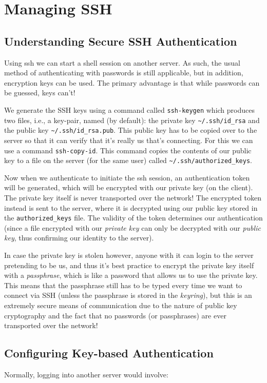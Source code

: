 \chapter{Managing SSH}

\section{Understanding Secure SSH Authentication}
Using ssh we can start a shell session on another server. As such, the usual method of authenticating with passwords is still applicable, but in addition, encryption keys can be used. The primary advantage is that while passwords can be guessed, keys can't!

We generate the SSH keys using a command called \verb|ssh-keygen| which produces two files, i.e., a key-pair, named (by default): the private key \verb|~/.ssh/id_rsa| and the public key \verb|~/.ssh/id_rsa.pub|. This public key has to be copied over to the server so that it can verify that it's really us that's connecting. For this we can use a command \verb|ssh-copy-id|. This command copies the contents of our public key to a file on the server (for the same user) called \verb|~/.ssh/authorized_keys|. 

Now when we authenticate to initiate the ssh session, an authentication token will be generated, which will be encrypted with our private key (on the client). The private key itself is never transported over the network! The encrypted token instead is sent to the server, where it is decrypted using our public key stored in the \verb|authorized_keys| file. The validity of the token determines our authentication (since a file encrypted with our \textit{private key} can only be decrypted with our \textit{public key}, thus confirming our identity to the server).

In case the private key is stolen however, anyone with it can login to the server pretending to be us, and thus it's best practice to encrypt the private key itself with a \textit{passphrase}, which is like a password that allows us to use the private key. This means that the passphrase still has to be typed every time we want to connect via SSH (unless the passphrase is stored in the \textit{keyring}), but this is an extremely secure means of communication due to the nature of public key cryptography and the fact that no passwords (or passphrases) are ever transported over the network!

\section{Configuring Key-based Authentication}
Normally, logging into another server would involve:

